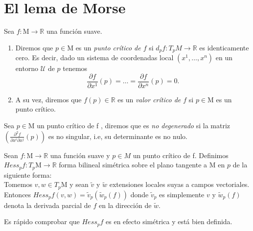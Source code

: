 \section{El lema de Morse}

\begin{definition}
    Sea $f: \mathrm{M} \to \mathbb{R}$ una función suave.
    \begin{enumerate}[label=\roman*)]
        \item Diremos que $p\in \mathrm{M}$ es un \textit{punto crítico de $f$} si $d_{p}f:T_{p}M\to \mathbb{R}$ es identicamente cero. Es decir, dado un sistema de coordenadas local $(x^{1}, \dots ,x^{n})$ en un entorno $\mathcal{U}$ de $p$ tenemos
        \begin{equation*}
            \frac{\partial f}{\partial x^1}(p)= \dots = \frac{\partial f}{\partial x^n}(p) = 0.
        \end{equation*}
        
        \item A su vez, diremos que $f(p)\in \mathbb{R}$ es un \textit{valor crítico de $f$} si $p \in \mathrm{M}$ es un punto crítico.
        
    \end{enumerate}
\end{definition}
\bigskip

\begin{definition}
    Sea $p\in \mathrm{M}$ un punto crítico de f , diremos que es \textit{no degenerado} si la matriz  $\left(\frac{\partial^{2}f}{\partial x^i \partial x^j}(p)\right)$ es no singular, i.e, su determinante es no nulo.
\end{definition}
\bigskip
\begin{definition}
    Sean $f:\mathrm{M}\to \mathbb{R}$ una función suave y $p\in M$ un punto crítico de f. Definimos $Hess_{p}f: T_{p}\mathrm{M}\to \mathbb{R}$ forma bilineal simétrica sobre el plano tangente a $\mathrm{M}$ en $p$ de la siguiente forma:\\

    Tomemos $v,w\in T_{p}\mathrm{M}$ y sean $\tilde{v}$ y $\tilde{w}$ extensiones locales suyas a campos vectoriales. Entonces $Hess_{p}f(v,w)=\tilde{v}_{p}(\tilde{w}_{p}(f))$ donde $\tilde{v}_{p}$ es simplemente $v$ y $\tilde{w}_{p}(f)$ denota la derivada parcial de $f$ en la dirección de $\tilde{w}$.
\end{definition}

Es rápido comprobar que $Hess_{p}f$ es en efecto simétrica y está bien definida.\\

